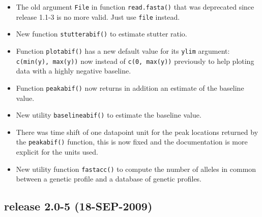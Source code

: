 \documentclass{article}
\begin{document}
\begin{itemize}

\item The old argument \texttt{File} in function \texttt{read.fasta()}
that was deprecated since release 1.1-3 is no more valid.
Just use \texttt{file} instead.

\item New function \texttt{stutterabif()} to estimate stutter ratio.

\item Function \texttt{plotabif()} has a new default value for its
\texttt{ylim} argument: \texttt{c(min(y), max(y))} now instead
of \texttt{c(0, max(y))} previously to help ploting data with
a highly negative baseline.

\item Function \texttt{peakabif()} now returns in addition an estimate
of the baseline value.

\item New utility \texttt{baselineabif()} to estimate the baseline
value.

\item There was time shift of one datapoint unit for the peak locations
returned by the \texttt{peakabif()} function, this is now fixed
and the documentation is more explicit for the units used.

\item New utility function \texttt{fastacc()} to compute the number
of alleles in common between a genetic profile and a database of
genetic profiles.

\end{itemize}

\subsection*{release 2.0-5 (18-SEP-2009)}
\end{document}

